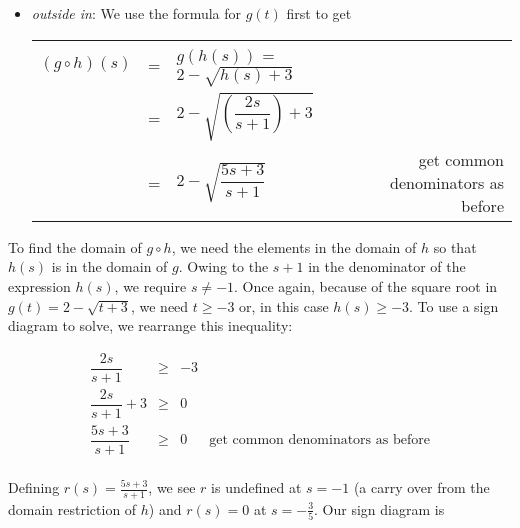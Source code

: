 \documentclass{ximera}
\begin{document}
\begin{example}
\begin{enumerate}
\begin{itemize}
\item  \textit{outside in}:  We use the formula for $g(t)$ first to get
\begin{longtable}{rclr} $(g \circ h)(s)$ & = & $g(h(s))$ = $2 - \sqrt{h(s)+3}$& \\ [2pt]
  & = & $2 - \sqrt{\left(\dfrac{2s}{s+1}\right)+3}$ & \\[12pt] 
 & = & $2 - \sqrt{\dfrac{5s+3}{s+1}}$ & get common denominators as before\\
 \end{longtable}

\end{itemize}

To find the domain of $g \circ h$, we need the elements in the domain of $h$ so that $h(s)$ is in the domain of $g$.  Owing to the $s+1$ in the denominator of the expression  $h(s)$, we require $s \neq -1$.  Once again, because  of the square root in $g(t) = 2 - \sqrt{t+3}$, we need $t \geq -3$ or, in this case $h(s)  \geq -3$.  To use a sign diagram to solve, we rearrange this inequality:

\[ \begin{array}{rclr}

\dfrac{2s}{s+1} & \geq & -3 & \\ [10pt]
\dfrac{2s}{s+1} +3 &   \geq & 0 & \\ [10pt]
\dfrac{5s+3}{s+1}  & \geq &  0  & \text{get common denominators as before} \\ \end{array} \]

 Defining $r(s) = \frac{5s+3}{s+1}$, we see $r$ is undefined at $s=-1$ (a carry over from the domain restriction of $h$) and $r(s) = 0$ at $s = -\frac{3}{5}$. Our sign diagram is

\begin{center}

% 



\end{center}
\end{enumerate}
\end{example}
\end{document}
